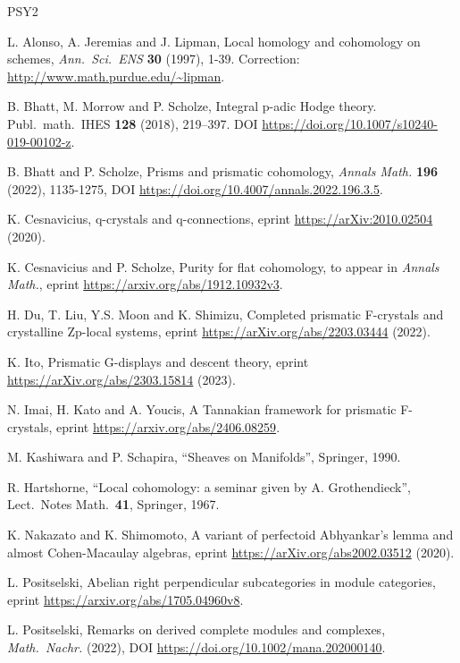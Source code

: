 \documentclass[10pt]{amsart}
\theoremstyle{definition}
\numberwithin{equation}{section}
\begin{document}
\begin{thebibliography}{PSY2}

 L. Alonso, A. Jeremias and J. Lipman,
Local homology and cohomology on schemes,
{\em Ann.\ Sci.\ ENS}  {\bf 30} (1997), 1-39. Correction:
\url{http://www.math.purdue.edu/~lipman}.

 B. Bhatt, M. Morrow and P. Scholze,
Integral p-adic Hodge theory.
Publ.\ math.\ IHES {\bf 128} (2018), 219–397.
DOI \url{https://doi.org/10.1007/s10240-019-00102-z}.

 B. Bhatt and P. Scholze,
Prisms and prismatic cohomology,
{\em Annals Math.} {\bf 196} (2022), 1135-1275,
DOI \url{https://doi.org/10.4007/annals.2022.196.3.5}.

 K. Cesnavicius,
q-crystals and q-connections,
eprint \url{https://arXiv:2010.02504} (2020).

 K. Cesnavicius and P. Scholze,
Purity for flat cohomology,
to appear in {\em Annals Math.}, eprint
\url{https://arxiv.org/abs/1912.10932v3}.

 H. Du, T. Liu, Y.S. Moon and K. Shimizu,
Completed prismatic F-crystals and crystalline Zp-local systems,
eprint \url{https://arXiv.org/abs/2203.03444} (2022).

 K. Ito,
Prismatic G-displays and descent theory,
eprint \url{https://arXiv.org/abs/2303.15814} (2023).

 N. Imai, H. Kato and A. Youcis,
A Tannakian framework for prismatic F-crystals,
eprint \url{https://arxiv.org/abs/2406.08259}.

 M. Kashiwara and P. Schapira,
``Sheaves on Manifolds'', Springer, 1990.

 R. Hartshorne,
``Local cohomology: a seminar given by A. Grothendieck'',
Lect.\ Notes Math.\ {\bf 41}, Springer, 1967.

 K. Nakazato and K. Shimomoto,
A variant of perfectoid Abhyankar's lemma and almost Cohen-Macaulay algebras,
eprint \url{https://arXiv.org/abs2002.03512} (2020).

 L. Positselski,
Abelian right perpendicular subcategories in module categories,
eprint \url{https://arxiv.org/abs/1705.04960v8}.

 L. Positselski,
Remarks on derived complete modules and complexes,
{\em Math.\ Nachr.} (2022),
DOI \url{https://doi.org/10.1002/mana.202000140}.


\end{thebibliography}
\end{document}
